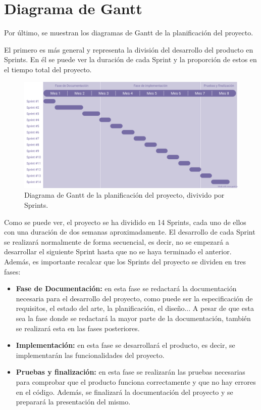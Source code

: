 \section{Diagrama de Gantt}
Por último, se muestran los diagramas de Gantt de la planificación del proyecto. 


El primero es más general y representa la división del desarrollo del producto en Sprints.
En él se puede ver la duración de cada Sprint y la proporción de estos en el tiempo total del proyecto. 

\begin{figure}[H]
    \centering
    \centerline{\includegraphics[width=1\textwidth]{imagenes/c4/gantt.png}}
    \caption{Diagrama de Gantt de la planificación del proyecto, divivido por Sprints.}
    \label{fig:diagrama_gantt}
\end{figure}

Como se puede ver, el proyecto se ha dividido en 14 Sprints, cada uno de ellos con una duración de dos semanas aproximadamente.
El desarrollo de cada Sprint se realizará normalmente de forma secuencial, es decir, no se empezará a desarrollar el siguiente 
Sprint hasta que no se haya terminado el anterior.
Además, es importante recalcar que los Sprints del proyecto se dividen en tres fases:
\begin{itemize}
    \item \textbf{Fase de Documentación:} en esta fase se redactará la documentación necesaria para el desarrollo del proyecto, como puede ser la especificación de requisitos, el estado del arte, la planificación, el diseño...
    A pesar de que esta sea la fase donde se redactará la mayor parte de la documentación, también se realizará esta en las fases posteriores.
    \item \textbf{Implementación:} en esta fase se desarrollará el producto, es decir, se implementarán las funcionalidades del proyecto.
    \item \textbf{Pruebas y finalización:} en esta fase se realizarán las pruebas necesarias para comprobar que el producto funciona correctamente y que no hay errores en el código. Además, se finalizará la documentación del proyecto y se preparará la presentación del mismo.
\end{itemize}


